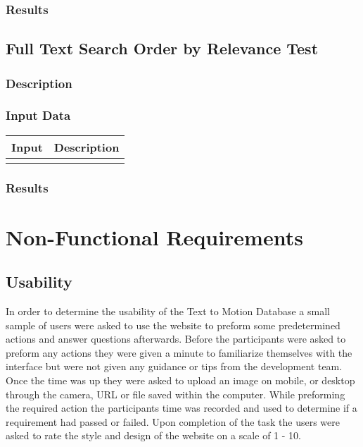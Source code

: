 \documentclass{scrreprt}
\begin{document}
\subsection{Results}

\section{Full Text Search Order by Relevance Test}
\subsection{Description}
\begin{flushleft}
\end{flushleft}
\subsection{Input Data}
 \centering
 \begin{tabular}{p{3cm}p{6cm}}
 \hline\hline
 Input & Description\\
 \hline\hline
   &  \\ %
 \hline
 \end{tabular}
\subsection{Results}

\chapter{Non-Functional Requirements}
\section{Usability}
\begin{flushleft}
In order to determine the usability of the Text to Motion Database a small sample of users were asked to use the website to preform some predetermined actions and answer questions afterwards. Before the participants were asked to preform any actions they were given a minute to familiarize themselves with the interface but were not given any guidance or tips from the development team. Once the time was up they were asked to upload an image on mobile, or desktop through the camera, URL or file saved within the computer. While preforming the required action the participants time was recorded and used to determine if a requirement had passed or failed. Upon completion of the task the users were asked to rate the style and design of the website on a scale of 1 - 10.
\end{flushleft}
\end{document}
